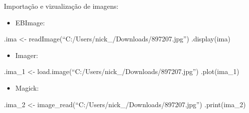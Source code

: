 \documentclass[
  ignorenonframetext,
]{beamer}
\providecommand{\tightlist}{%
  \setlength{\itemsep}{0pt}\setlength{\parskip}{0pt}}
\begin{document}
\begin{frame}{Importação e vizualização de imagens:}
\protect\hypertarget{importauxe7uxe3o-e-vizualizauxe7uxe3o-de-imagens}{}

\small

\begin{itemize}
\tightlist
\item
  EBImage:
\end{itemize}

.ima \textless- readImage(``C:/Users/nick\_/Downloads/897207.jpg'')
.display(ima)

\begin{itemize}
\tightlist
\item
  Imager:
\end{itemize}

.ima\_1 \textless- load.image(``C:/Users/nick\_/Downloads/897207.jpg'')
.plot(ima\_1)

\begin{itemize}
\tightlist
\item
  Magick:
\end{itemize}

.ima\_2 \textless- image\_read(``C:/Users/nick\_/Downloads/897207.jpg'')
.print(ima\_2)

\end{frame}
\end{document}
